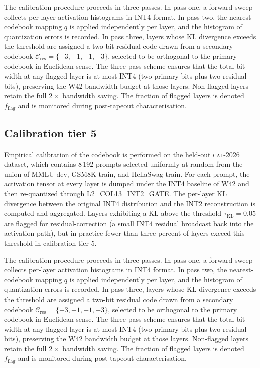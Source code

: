 The calibration procedure proceeds in three passes. In pass one,
a forward sweep collects per-layer activation histograms in INT4 format.
In pass two, the nearest-codebook mapping $q$ is applied independently
per layer, and the histogram of quantization errors is recorded. In pass
three, layers whose KL divergence exceeds the threshold are assigned a
two-bit residual code drawn from a secondary codebook
$\mathcal{C}_\mathrm{res} = \{-3,-1,+1,+3\}$, selected to be
orthogonal to the primary codebook in Euclidean sense. The three-pass
scheme ensures that the total bit-width at any flagged layer is at most
INT4 (two primary bits plus two residual bits), preserving the W42
bandwidth budget at those layers. Non-flagged layers retain the full
$2\times$ bandwidth saving. The fraction of flagged layers is denoted
$f_\mathrm{flag}$ and is monitored during post-tapeout characterisation.


\subsection{Calibration tier 5}

Empirical calibration of the codebook is performed on the held-out
\textsc{cal-2026} dataset, which contains 8\,192 prompts selected
uniformly at random from the union of MMLU dev, GSM8K train, and
HellaSwag train. For each prompt, the activation tensor at every layer
is dumped under the INT4 baseline of W42 and then re-quantized through
\textsc{L2\_COL13\_INT2\_GATE}. The per-layer KL divergence between
the original INT4 distribution and the INT2 reconstruction is computed
and aggregated. Layers exhibiting a KL above the threshold
$\tau_{\mathrm{KL}} = 0.05$ are flagged for residual-correction (a
small INT4 residual broadcast back into the activation path), but in
practice fewer than three percent of layers exceed this threshold in
calibration tier 5.

The calibration procedure proceeds in three passes. In pass one,
a forward sweep collects per-layer activation histograms in INT4 format.
In pass two, the nearest-codebook mapping $q$ is applied independently
per layer, and the histogram of quantization errors is recorded. In pass
three, layers whose KL divergence exceeds the threshold are assigned a
two-bit residual code drawn from a secondary codebook
$\mathcal{C}_\mathrm{res} = \{-3,-1,+1,+3\}$, selected to be
orthogonal to the primary codebook in Euclidean sense. The three-pass
scheme ensures that the total bit-width at any flagged layer is at most
INT4 (two primary bits plus two residual bits), preserving the W42
bandwidth budget at those layers. Non-flagged layers retain the full
$2\times$ bandwidth saving. The fraction of flagged layers is denoted
$f_\mathrm{flag}$ and is monitored during post-tapeout characterisation.


